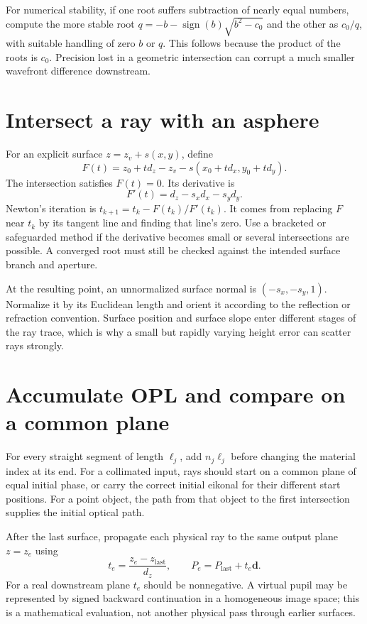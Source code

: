 For numerical stability, if one root suffers subtraction of nearly equal numbers, compute the more stable root $q=-b-\operatorname{sign}(b)\sqrt{b^2-c_0}$ and the other as $c_0/q$, with suitable handling of zero $b$ or $q$. This follows because the product of the roots is $c_0$. Precision lost in a geometric intersection can corrupt a much smaller wavefront difference downstream.

\section{Intersect a ray with an asphere}
For an explicit surface $z=z_v+s(x,y)$, define
\[
F(t)=z_0+td_z-z_v-s(x_0+td_x,y_0+td_y).
\]
The intersection satisfies $F(t)=0$. Its derivative is
\[
F'(t)=d_z-s_xd_x-s_yd_y.
\]
Newton's iteration is $t_{k+1}=t_k-F(t_k)/F'(t_k)$. It comes from replacing $F$ near $t_k$ by its tangent line and finding that line's zero. Use a bracketed or safeguarded method if the derivative becomes small or several intersections are possible. A converged root must still be checked against the intended surface branch and aperture.

At the resulting point, an unnormalized surface normal is $(-s_x,-s_y,1)$. Normalize it by its Euclidean length and orient it according to the reflection or refraction convention. Surface position and surface slope enter different stages of the ray trace, which is why a small but rapidly varying height error can scatter rays strongly.

\section{Accumulate OPL and compare on a common plane}
For every straight segment of length $\ell_j$, add $n_j\ell_j$ before changing the material index at its end. For a collimated input, rays should start on a common plane of equal initial phase, or carry the correct initial eikonal for their different start positions. For a point object, the path from that object to the first intersection supplies the initial optical path.

After the last surface, propagate each physical ray to the same output plane $z=z_e$ using
\[
t_e=\frac{z_e-z_{\mathrm{last}}}{d_z},\qquad
P_e=P_{\mathrm{last}}+t_e\bm{d}.
\]
For a real downstream plane $t_e$ should be nonnegative. A virtual pupil may be represented by signed backward continuation in a homogeneous image space; this is a mathematical evaluation, not another physical pass through earlier surfaces.

